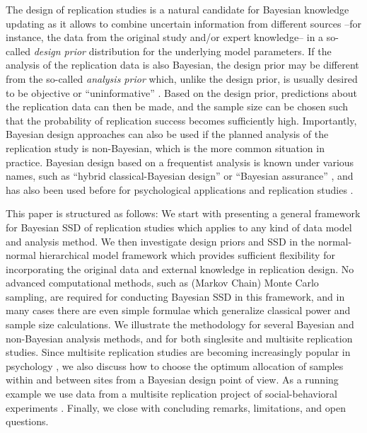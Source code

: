The design of replication studies is a natural candidate for Bayesian knowledge
updating as it allows to combine uncertain information from different sources
--for instance, the data from the original study and/or expert knowledge-- in a
so-called \emph{design prior} distribution for the underlying model parameters.
If the analysis of the replication data is also Bayesian, the design prior may
be different from the so-called \emph{analysis prior} which, unlike the design
prior, is usually desired to be objective or ``uninformative''
\citep{OHagan2001b}. Based on the design prior, predictions about the
replication data can then be made, and the sample size can be chosen such that
the probability of replication success becomes sufficiently high. Importantly,
Bayesian design approaches can also be used if the planned analysis of the
replication study is non-Bayesian, which is the more common situation in
practice. Bayesian design based on a frequentist analysis is known under various
names, such as ``hybrid classical-Bayesian design'' \citep{Spiegelhalter2004} or
``Bayesian assurance'' \citep{OHagan2005}, and has also been used before for
psychological applications \citep{Pek2019, Park2022} and replication studies
\citep{Anderson2017, Micheloud2020}.

This paper is structured as follows: We start with presenting a general
framework for Bayesian SSD of replication studies which applies to any kind of
data model and analysis method. We then investigate design priors and SSD in the
normal-normal hierarchical model framework which provides sufficient flexibility
for incorporating the original data and external knowledge in replication
design. No advanced computational methods, such as (Markov Chain) Monte Carlo
sampling, are required for conducting Bayesian SSD in this framework, and in
many cases there are even simple formulae which generalize classical power and
sample size calculations. We illustrate the methodology for several Bayesian and
non-Bayesian analysis methods, and for both singlesite and multisite replication
studies. Since multisite replication studies are becoming increasingly popular
in psychology \citep[\eg{}][]{Klein2018}, we also discuss how to choose the
optimum allocation of samples within and between sites from a Bayesian design
point of view. As a running example we use data from a multisite replication
project of social-behavioral experiments \citep{Protzko2020}. Finally, we close
with concluding remarks, limitations, and open questions.



